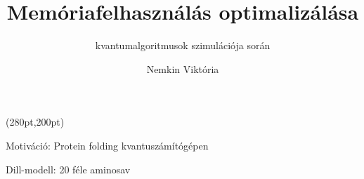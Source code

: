 \documentclass[aspectratio=169]{beamer}
\author[Nemkin Viktória]{Nemkin Viktória}
\institute[]{
\begin{small}dr. Friedl Katalin\end{small}\\
\begin{footnotesize}Számítástudományi és Információelméleti Tanszék\end{footnotesize}
}
\title{Memóriafelhasználás optimalizálása}
\subtitle{kvantumalgoritmusok szimulációja során}
\date{}
\begin{document}
\begin{frame}
\titlepage

\begin{textblock*}{150pt}(280pt,200pt) %

\end{textblock*}
\end{frame}


\begin{frame}{Motiváció: Protein folding kvantuszámítógépen}
\begin{itmeize}
  \item Dill-modell: 20 féle aminosav
  \item 
\end{itmeize}
\end{frame}
\end{document}
